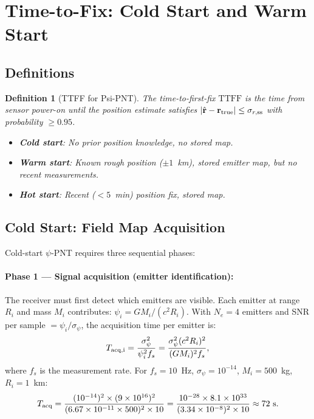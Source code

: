 \documentclass[aps,prd,twocolumn,superscriptaddress,nofootinbib]{revtex4-2}
\newcommand{\TTFF}{\mathrm{TTFF}}
\newtheorem{definition}{Definition}
\begin{document}
\section{Time-to-Fix: Cold Start and Warm Start}
\label{sec:ttff}

\subsection{Definitions}

\begin{definition}[TTFF for Psi-PNT]
The \emph{time-to-first-fix} $\TTFF$ is the time from sensor power-on
until the position estimate satisfies $|\hat{\mathbf{r}} - \mathbf{r}_{\rm true}|
\leq \sigma_{r,\rm ss}$ with probability $\geq 0.95$.
\begin{itemize}
\item \textbf{Cold start}: No prior position knowledge, no stored map.
\item \textbf{Warm start}: Known rough position ($\pm 1$~km), stored
  emitter map, but no recent measurements.
\item \textbf{Hot start}: Recent ($< 5$~min) position fix, stored map.
\end{itemize}
\end{definition}

\subsection{Cold Start: Field Map Acquisition}

Cold-start $\psi$-PNT requires three sequential phases:

\paragraph{Phase 1 --- Signal acquisition (emitter identification):}
The receiver must first detect which emitters are visible.  Each
emitter at range $R_i$ and mass $M_i$ contributes:
$\psi_i = GM_i/(c^2 R_i)$.  With $N_e = 4$ emitters and SNR per sample
$= \psi_i/\sigma_\psi$, the acquisition time per emitter is:
\begin{equation}
  T_{\rm acq,i} = \frac{\sigma_\psi^2}{\psi_i^2 f_s}
  = \frac{\sigma_\psi^2 (c^2 R_i)^2}{(GM_i)^2 f_s},
  \label{eq:tacq}
\end{equation}
where $f_s$ is the measurement rate.  For $f_s = 10$~Hz,
$\sigma_\psi = 10^{-14}$, $M_i = 500$~kg, $R_i = 1$~km:
\begin{equation}
  T_{\rm acq} = \frac{(10^{-14})^2 \times (9\times10^{16})^2}
  {(6.67\times10^{-11}\times500)^2 \times 10}
  = \frac{10^{-28}\times8.1\times10^{33}}
  {(3.34\times10^{-8})^2\times10}
  \approx 72~\mathrm{s}.
  \label{eq:tacq-num}
\end{equation}
\end{document}
